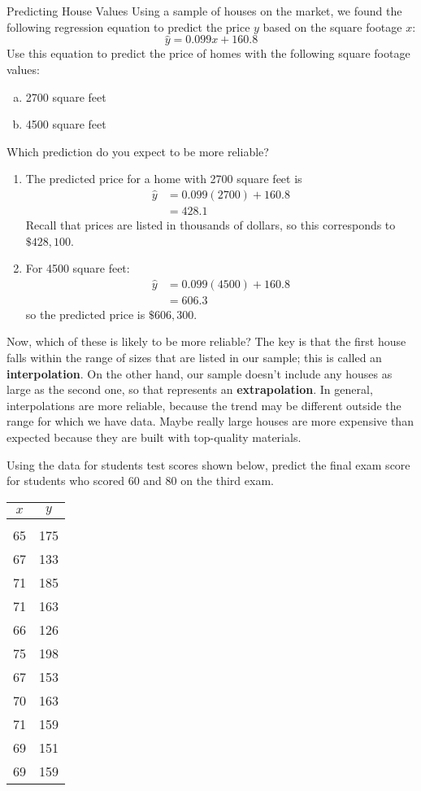 \begin{example}{Predicting House Values}
Using a sample of houses on the market, we found the following regression equation to predict the price $y$ based on the square footage $x$:
\[\hat{y} = 0.099x + 160.8\]
Use this equation to predict the price of homes with the following square footage values:
\begin{enumerate}[(a)]
\item 2700 square feet
\item 4500 square feet
\end{enumerate}
Which prediction do you expect to be more reliable?

\sol
\begin{enumerate}
\item The predicted price for a home with 2700 square feet is
\begin{align*}
\hat{y} &= 0.099(2700) + 160.8\\
&= 428.1
\end{align*}
Recall that prices are listed in thousands of dollars, so this corresponds to $\boxed{\$428,100}$.

\item For 4500 square feet:
\begin{align*}
\hat{y} &= 0.099(4500) + 160.8\\
&= 606.3
\end{align*}
so the predicted price is $\boxed{\$606,300}$.
\end{enumerate}

Now, which of these is likely to be more reliable?  The key is that the first house falls within the range of sizes that are listed in our sample; this is called an \textbf{interpolation}.  On the other hand, our sample doesn't include any houses as large as the second one, so that represents an \textbf{extrapolation}.  In general, interpolations are more reliable, because the trend may be different outside the range for which we have data.  Maybe really large houses are more expensive than expected because they are built with top-quality materials.
\end{example}

\begin{try}
Using the data for students test scores shown below, predict the final exam score for students who scored 60 and 80 on the third exam.
\begin{center}
\begin{tabular}{c c}
$x$ & $y$\\
\hline
\\
65 & 175\\
67 & 133\\
71 & 185\\
71 & 163\\
66 & 126\\
75 & 198\\
67 & 153\\
70 & 163\\
71 & 159\\
69 & 151\\
69 & 159
\end{tabular}
\end{center}
\end{try}

